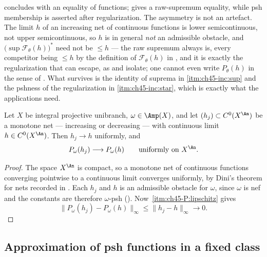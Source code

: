 \begin{remark}
\label{rem:ch45-increasing-asymmetry}
 concludes with an equality of
functions;  gives a raw-supremum equality,
while psh membership is asserted after regularization.  The asymmetry is not an artefact.  The limit $h$ of an
increasing net of continuous functions is lower semicontinuous, not upper
semicontinuous, so $h$ is in general \emph{not} an admissible obstacle,
and $\bigl(\sup\mathcal F_\theta(h)\bigr)^*$ need not be $\le h$ --- the
raw supremum always is, every competitor being $\le h$ by the definition
of $\mathcal F_\theta(h)$ in , and it is exactly the
regularization that can escape, as
 and 
isolate; one cannot even write
$P_\theta(h)$ in the sense of
.  What survives is the identity of
suprema in \cref{itm:ch45-inc:sup} and the pshness of the regularization in
\cref{itm:ch45-inc:star}, which is exactly what the applications need.
\end{remark}

\begin{corollary}
\label{cor:ch45-uniform-obstacles}
Let $X$ be integral projective unibranch, $\omega\in\Amp(X)$, and let
$(h_j)\subset C^0(X^{\An})$ be a monotone net --- increasing or
decreasing --- with continuous limit $h\in C^0(X^{\An})$.  Then
$h_j\to h$ uniformly, and
\[
 P_\omega(h_j)\longrightarrow P_\omega(h)
 \qquad\text{uniformly on }X^{\An}.
\]
\end{corollary}

\begin{proof}
The space $X^{\An}$ is compact, so a monotone net of continuous functions
converging pointwise to a continuous limit converges uniformly, by Dini's
theorem for nets recorded in .  Each $h_j$ and $h$ is an
admissible obstacle for $\omega$, since $\omega$ is nef and the
constants are therefore $\omega$-psh
().  Now
\,\cref{itm:ch45-P:lipschitz} gives
\[
 \lVert P_\omega(h_j)-P_\omega(h)\rVert_\infty
 \le\lVert h_j-h\rVert_\infty\longrightarrow0 .
\]
\end{proof}

\subsection{Approximation of psh functions in a fixed class}
\label{sec:ch45-fixed-class-approximation}

